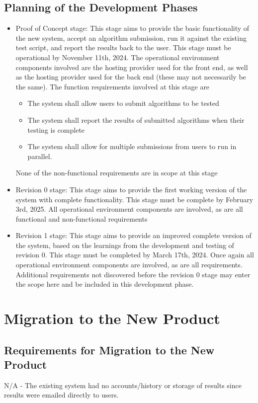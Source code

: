 \documentclass[12pt]{article}
\begin{document}
\subsection{Planning of the Development Phases}
\begin{itemize}
\item Proof of Concept stage:
This stage aims to provide the basic functionality of the new system, accept an algorithm submission, run it against the existing test script, and report the results back to the user. This stage must be operational by November 11th, 2024. The operational environment components involved are the hosting provider used for the front end, as well as the hosting provider used for the back end (these may not necessarily be the same). The function requirements involved at this stage are
\begin{itemize}
    \item The system shall allow users to submit algorithms to be tested 
\item The system shall report the results of submitted algorithms when their testing is complete
\item The system shall allow for multiple submissions from users to run in parallel. 
\end{itemize}

None of the non-functional requirements are in scope at this stage

\item Revision 0 stage:
This stage aims to provide the first working version of the system with complete functionality. This stage must be complete by February 3rd, 2025. All operational environment components are involved, as are all functional and non-functional requirements
	
\item Revision 1 stage:
This stage aims to provide an improved complete version of the system, based on the learnings from the development and testing of revision 0. This stage must be completed by March 17th, 2024. Once again all operational environment components are involved, as are all requirements. Additional requirements not discovered before the revision 0 stage may enter the scope here and be included in this development phase.  
\end{itemize}


\section{Migration to the New Product}
\subsection{Requirements for Migration to the New Product}
N/A - The existing system had no accounts/history or storage of results since results were emailed directly to users.
\end{document}
